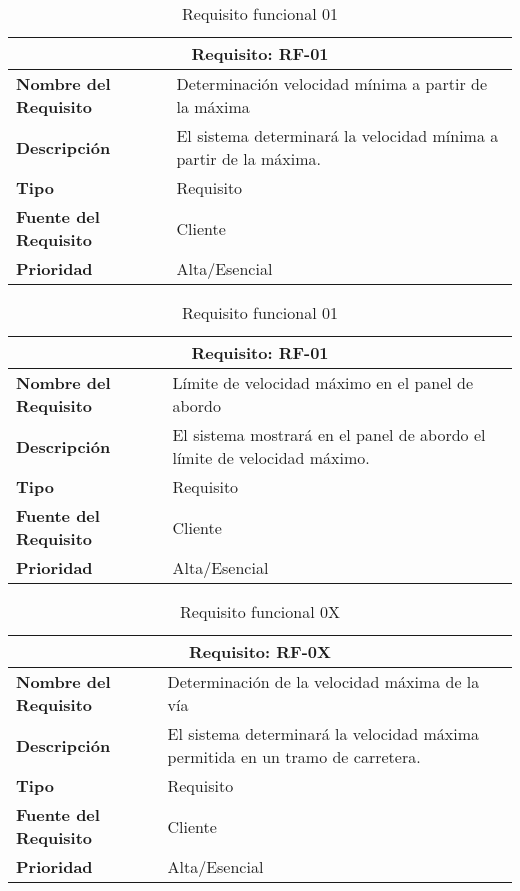 \begin{table}[H]
\begin{center}
\begin{tabular}{p{} p{7cm}}
\multicolumn{2}{c}{\textbf{Requisito: RF-01} } \\
\hline \hline
\textbf{Nombre del Requisito} & Determinación velocidad mínima a partir de la máxima \\
\hline
\textbf{Descripción} &  El sistema determinará la velocidad mínima a partir de la máxima.\\
\hline
\textbf{Tipo} & Requisito \\
\hline
\textbf{Fuente del Requisito} & Cliente \\
\hline
\textbf{Prioridad} & Alta/Esencial \\ \hline
\end{tabular}
\caption{Requisito funcional 01}
\label{tab:personal}
\end{center}
\end{table}

\begin{table}[H]
\begin{center}
\begin{tabular}{p{} p{7cm}}
\multicolumn{2}{c}{\textbf{Requisito: RF-01} } \\
\hline \hline
\textbf{Nombre del Requisito} &  Límite de velocidad máximo en el panel de abordo\\
\hline
\textbf{Descripción} &  El sistema mostrará en el panel de abordo el límite de velocidad máximo.\\
\hline
\textbf{Tipo} & Requisito \\
\hline
\textbf{Fuente del Requisito} & Cliente \\
\hline
\textbf{Prioridad} & Alta/Esencial \\ \hline
\end{tabular}
\caption{Requisito funcional 01}
\label{tab:personal}
\end{center}
\end{table}

\begin{table}[H]
\begin{center}
\begin{tabular}{p{} p{7cm}}
\multicolumn{2}{c}{\textbf{Requisito: RF-0X} } \\
\hline \hline
\textbf{Nombre del Requisito} & Determinación de la velocidad máxima de la vía \\
\hline
\textbf{Descripción} & El sistema determinará la velocidad máxima permitida en un tramo de carretera. \\
\hline
\textbf{Tipo} & Requisito  \\
\hline
\textbf{Fuente del Requisito} & Cliente  \\
\hline
\textbf{Prioridad} & Alta/Esencial  \\ \hline
\end{tabular}
\caption{Requisito funcional 0X}
\label{tab:personal}
\end{center}
\end{table}

